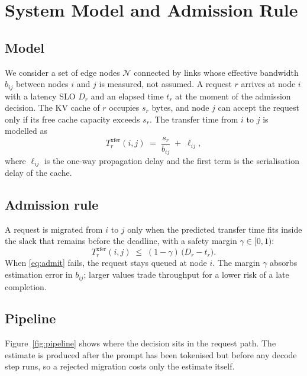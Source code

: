 \section{System Model and Admission Rule}
\label{sec:method}

\subsection{Model}

We consider a set of edge nodes $\mathcal{N}$ connected by links whose effective bandwidth $b_{ij}$ between nodes $i$ and $j$ is measured, not assumed.
A request $r$ arrives at node $i$ with a latency SLO $D_r$ and an elapsed time $t_r$ at the moment of the admission decision.
The KV cache of $r$ occupies $s_r$ bytes, and node $j$ can accept the request only if its free cache capacity exceeds $s_r$.
The transfer time from $i$ to $j$ is modelled as
\begin{equation}
\label{eq:transfer}
  T^{\mathrm{xfer}}_{r}(i,j) \;=\; \frac{s_r}{b_{ij}} \;+\; \ell_{ij},
\end{equation}
where $\ell_{ij}$ is the one-way propagation delay and the first term is the serialisation delay of the cache.

\subsection{Admission rule}

A request is migrated from $i$ to $j$ only when the predicted transfer time fits inside the slack that remains before the deadline, with a safety margin $\gamma \in [0,1)$:
\begin{equation}
\label{eq:admit}
  T^{\mathrm{xfer}}_{r}(i,j) \;\le\; (1-\gamma)\,\bigl(D_r - t_r\bigr).
\end{equation}
When \eqref{eq:admit} fails, the request stays queued at node $i$.
The margin $\gamma$ absorbs estimation error in $b_{ij}$; larger values trade throughput for a lower risk of a late completion.

\subsection{Pipeline}

Figure~\ref{fig:pipeline} shows where the decision sits in the request path.
The estimate is produced after the prompt has been tokenised but before any decode step runs, so a rejected migration costs only the estimate itself.

